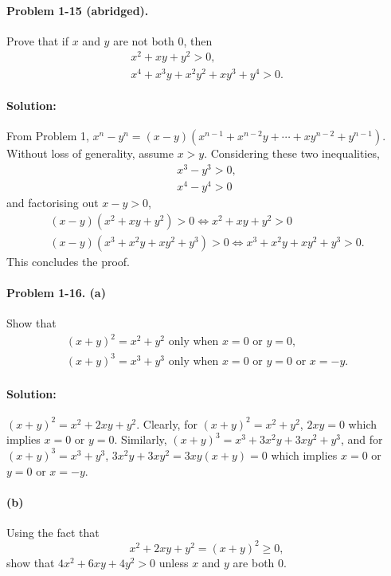 \documentclass{article}
\begin{document}
\paragraph{Problem 1-15 (abridged).} Prove that if $x$ and $y$ are not both 0,
then \begin{gather*}
  x^2 + xy + y^2 > 0, \\
  x^4 + x^3y + x^2y^2 + xy^3 + y^4 > 0.
\end{gather*}

\paragraph{Solution:} From Problem 1, $x^n - y^n = (x - y)(x^{n-1} + x^{n-2}y +
\cdots + xy^{n-2} + y^{n-1})$. Without loss of generality, assume $x > y$.
Considering these two inequalities, \begin{gather*}
  x^3 - y^3 > 0, \\
  x^4 - y^4 > 0
\end{gather*} and factorising out $x - y > 0$, \begin{gather*}
  (x - y)(x^2 + xy + y^2) > 0 \iff x^2 + xy + y^2 > 0 \\
  (x - y)(x^3 + x^2y + xy^2 + y^3) > 0 \iff x^3 + x^2y + xy^2 + y^3 > 0.
\end{gather*}
This concludes the proof.

\paragraph{Problem 1-16. (a)} Show that \begin{gather*}
  (x + y)^2 = x^2 + y^2 \text{ only when } x = 0 \text{ or } y = 0, \\
  (x + y)^3 = x^3 + y^3 \text{ only when } x = 0 \text{ or } y = 0 \text{ or }
  x = -y.
\end{gather*}

\paragraph{Solution:} $(x + y)^2 = x^2 + 2xy + y^2$. Clearly, for
$(x + y)^2 = x^2 + y^2$, $2xy = 0$ which implies $x = 0$ or $y = 0$. Similarly,
$(x + y)^3 = x^3 + 3x^2y + 3xy^2 + y^3$, and for $(x + y)^3 = x^3 + y^3$,
$3x^2y + 3xy^2 = 3xy(x + y) = 0$ which implies $x = 0$ or $y = 0$ or $x = -y$.

\paragraph{(b)} Using the fact that \begin{equation*}
  x^2 + 2xy + y^2 = (x + y)^2 \geq 0,
\end{equation*} show that $4x^2 + 6xy + 4y^2 > 0$ unless $x$ and $y$ are both
0.
\end{document}
